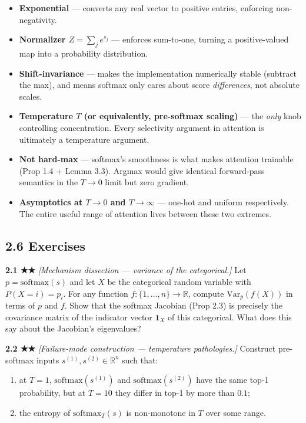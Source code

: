 \documentclass[
]{article}
\providecommand{\tightlist}{%
  \setlength{\itemsep}{0pt}\setlength{\parskip}{0pt}}
\begin{document}
\begin{itemize}
\tightlist
\item
  \textbf{Exponential} --- converts any real vector to positive entries,
  enforcing non-negativity.
\item
  \textbf{Normalizer \(Z = \sum_j e^{s_j}\)} --- enforces sum-to-one,
  turning a positive-valued map into a probability distribution.
\item
  \textbf{Shift-invariance} --- makes the implementation numerically
  stable (subtract the max), and means softmax only cares about score
  \emph{differences}, not absolute scales.
\item
  \textbf{Temperature \(T\) (or equivalently, pre-softmax scaling)} ---
  the \emph{only} knob controlling concentration. Every selectivity
  argument in attention is ultimately a temperature argument.
\item
  \textbf{Not hard-max} --- softmax's smoothness is what makes attention
  trainable (Prop 1.4 + Lemma 3.3). Argmax would give identical
  forward-pass semantics in the \(T \to 0\) limit but zero gradient.
\item
  \textbf{Asymptotics at \(T \to 0\) and \(T \to \infty\)} --- one-hot
  and uniform respectively. The entire useful range of attention lives
  between these two extremes.
\end{itemize}

\hypertarget{exercises}{%
\subsection{2.6 Exercises}\label{exercises}}

\textbf{2.1 ★★} \emph{{[}Mechanism dissection --- variance of the
categorical.{]}} Let \(p = \text{softmax}(s)\) and let \(X\) be the
categorical random variable with \(P(X = i) = p_i\). For any function
\(f: \{1, \dots, n\} \to \mathbb{R}\), compute \(\text{Var}_p(f(X))\) in
terms of \(p\) and \(f\). Show that the softmax Jacobian (Prop 2.3) is
precisely the covariance matrix of the indicator vector \(\mathbf{1}_X\)
of this categorical. What does this say about the Jacobian's
eigenvalues?

\textbf{2.2 ★★} \emph{{[}Failure-mode construction --- temperature
pathologies.{]}} Construct pre-softmax inputs
\(s^{(1)}, s^{(2)} \in \mathbb{R}^n\) such that:

\begin{enumerate}
\def\labelenumi{(\alph{enumi})}
\item
  at \(T = 1\), \(\text{softmax}(s^{(1)})\) and
  \(\text{softmax}(s^{(2)})\) have the same top-1 probability, but at
  \(T = 10\) they differ in top-1 by more than \(0.1\);
\item
  the entropy of \(\text{softmax}_T(s)\) is non-monotone in \(T\) over
  some range.
\end{enumerate}
\end{document}
